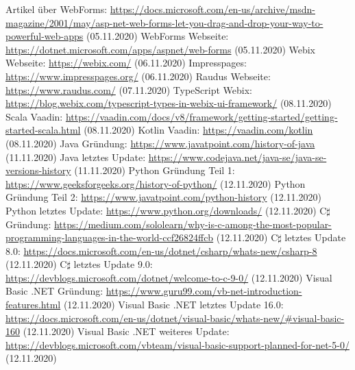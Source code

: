 \documentclass[ngerman]{article}
\begin{document}
\begin{thebibliography}{9}
        Artikel über WebForms: \url{https://docs.microsoft.com/en-us/archive/msdn-magazine/2001/may/asp-net-web-forms-let-you-drag-and-drop-your-way-to-powerful-web-apps} (05.11.2020)
        WebForms Webseite: \url{https://dotnet.microsoft.com/apps/aspnet/web-forms} (05.11.2020)
        Webix Webseite: \url{https://webix.com/} (06.11.2020)
        Impresspages: \url{https://www.impresspages.org/} (06.11.2020)
        Raudus Webseite: \url{https://www.raudus.com/} (07.11.2020)
        TypeScript Webix: \url{https://blog.webix.com/typescript-types-in-webix-ui-framework/} (08.11.2020)
        Scala Vaadin: \url{https://vaadin.com/docs/v8/framework/getting-started/getting-started-scala.html} (08.11.2020)
        Kotlin Vaadin: \url{https://vaadin.com/kotlin} (08.11.2020)
        Java Gründung: \url{https://www.javatpoint.com/history-of-java} (11.11.2020)
        Java letztes Update: \url{https://www.codejava.net/java-se/java-se-versions-history} (11.11.2020)
        Python Gründung Teil 1: \url{https://www.geeksforgeeks.org/history-of-python/} (12.11.2020)
        Python Gründung Teil 2: \url{https://www.javatpoint.com/python-history} (12.11.2020)
        Python letztes Update: \url{https://www.python.org/downloads/} (12.11.2020)
        C$\sharp$ Gründung: \url{https://medium.com/sololearn/why-is-c-among-the-most-popular-programming-languages-in-the-world-ccf26824ffcb} (12.11.2020)
        C$\sharp$ letztes Update 8.0: \url{https://docs.microsoft.com/en-us/dotnet/csharp/whats-new/csharp-8} (12.11.2020)
        C$\sharp$ letztes Update 9.0: \url{https://devblogs.microsoft.com/dotnet/welcome-to-c-9-0/} (12.11.2020)
        Visual Basic .NET Gründung: \url{https://www.guru99.com/vb-net-introduction-features.html} (12.11.2020)
        Visual Basic .NET letztes Update 16.0: \url{https://docs.microsoft.com/en-us/dotnet/visual-basic/whats-new/#visual-basic-160} (12.11.2020)
        Visual Basic .NET weiteres Update: \url{https://devblogs.microsoft.com/vbteam/visual-basic-support-planned-for-net-5-0/} (12.11.2020)

\end{thebibliography}
\end{document}
